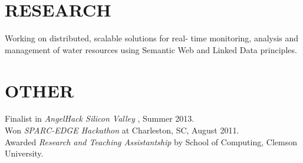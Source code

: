 \documentclass[line,margin]{res}
\begin{document}
\begin{resume}
\section{RESEARCH}  Working on distributed, scalable solutions for real- time monitoring, analysis and management of water resources using Semantic Web and Linked Data principles.

\section{OTHER}             
            Finalist in {\it AngelHack Silicon Valley} , Summer 2013. \\
            Won {\it SPARC-EDGE Hackathon} at Charleston, SC, August 2011. \\
            Awarded {\it Research and Teaching Assistantship} by School of Computing, Clemson University.\\ 
\end{resume}
\end{document}
